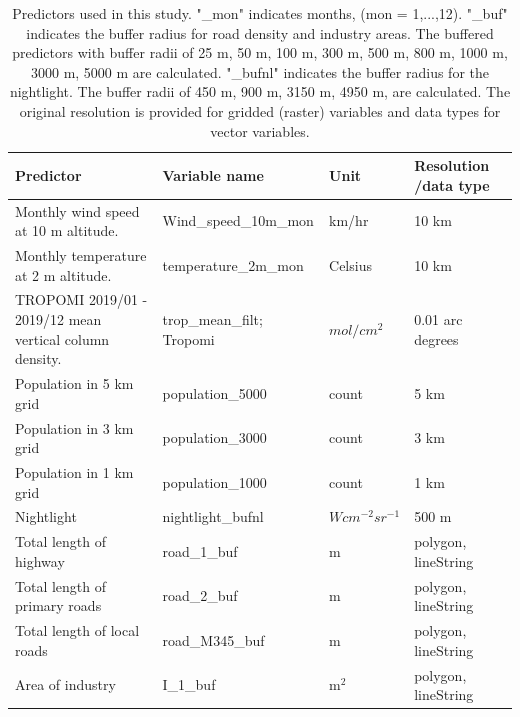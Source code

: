 \documentclass{article}
\begin{document}
  
\begin{table}[H] 
\centering
\caption{Predictors used in this study. "\_mon" indicates months, (mon = 1,...,12).  "\_buf" indicates the buffer radius for road density and industry areas. The buffered predictors with buffer radii of 25 m, 50 m, 100 m, 300 m, 500 m, 800 m, 1000 m, 3000 m, 5000 m are calculated. "\_bufnl" indicates the buffer radius for the nightlight. The buffer radii of 450 m, 900 m, 3150 m, 4950 m, are calculated. The original resolution is provided for gridded (raster) variables and data types for vector variables.}

\label{tab:prevar}
{
\begin{tabular}{p{6cm}|l|l|l}
\hline
Predictor                                    & Variable name                & Unit         & Resolution /data type         \\ \hline
Monthly wind speed at 10 m altitude. &  Wind\_speed\_10m\_mon   & km/hr         &    10 km \\ \hline
Monthly temperature at 2 m altitude.  & temperature\_2m\_mon  &  Celsius        &    10 km \\ \hline
 
TROPOMI 2019/01 - 2019/12 mean vertical column density.  & trop\_mean\_filt; Tropomi&  $mol /cm^2$ &   0.01 arc degrees  \\ \hline

Population in 5 km grid  & population\_5000 & count  & 5 km \\ \hline
Population in 3 km grid & population\_3000 & count  & 3 km \\ \hline
Population in 1 km grid  & population\_1000 & count  & 1 km\\ \hline
Nightlight  & nightlight\_bufnl & $W cm^{-2} sr^{-1}$  & 500 m\\ \hline
Total length of highway  & road\_1\_buf  & m &polygon, lineString              \\\hline
Total length of primary roads                   & road\_2\_buf          & m  &polygon, lineString            \\\hline
Total length of local roads     & road\_M345\_buf        & m  &polygon, lineString               \\\hline
Area of industry                                    & I\_1\_buf           & m$^2$ &polygon, lineString            \\\hline
 

\end{tabular}
}  
\end{table}
\end{document}
